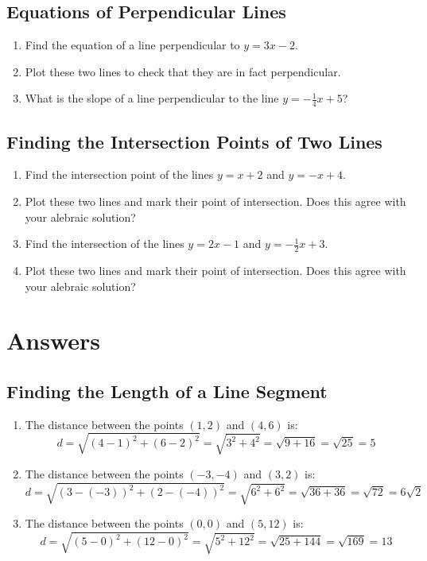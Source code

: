 \documentclass[12pt]{article}
\begin{document}
\subsection*{Equations of Perpendicular Lines}

\begin{enumerate}
    \item Find the equation of a line perpendicular to \(y = 3x - 2\).
    \item Plot these two lines to check that they are in fact perpendicular.
    \item What is the slope of a line perpendicular to the line \(y = -\frac{1}{4}x + 5\)?
\end{enumerate}

\subsection*{Finding the Intersection Points of Two Lines}
\begin{enumerate}
    \item Find the intersection point of the lines \(y = x + 2\) and \(y = -x + 4\).
    \item Plot these two lines and mark their point of intersection. Does this agree with your alebraic solution?
    \item Find the intersection of the lines \(y = 2x - 1\) and \(y = -\frac{1}{2}x + 3\).
    \item Plot these two lines and mark their point of intersection. Does this agree with your alebraic solution?
\end{enumerate}

\section*{Answers}

\subsection*{Finding the Length of a Line Segment}
\begin{enumerate}
    \item The distance between the points \((1, 2)\) and \((4, 6)\) is:
    \[
    d = \sqrt{(4 - 1)^2 + (6 - 2)^2} = \sqrt{3^2 + 4^2} = \sqrt{9 + 16} = \sqrt{25} = 5
    \]
    
    \item The distance between the points \((-3, -4)\) and \((3, 2)\) is:
    \[
    d = \sqrt{(3 - (-3))^2 + (2 - (-4))^2} = \sqrt{6^2 + 6^2} = \sqrt{36 + 36} = \sqrt{72} = 6\sqrt{2}
    \]
    
    \item The distance between the points \((0, 0)\) and \((5, 12)\) is:
    \[
    d = \sqrt{(5 - 0)^2 + (12 - 0)^2} = \sqrt{5^2 + 12^2} = \sqrt{25 + 144} = \sqrt{169} = 13
    \]
\end{enumerate}
\end{document}
